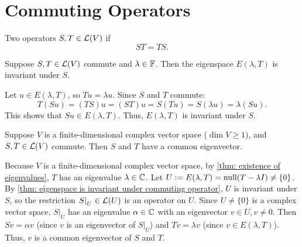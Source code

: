 \section{Commuting Operators}

\begin{mydef}
  Two operators $S, T \in \mathcal{L}(V)$  if
  \begin{equation}
    ST = TS.
  \end{equation}
\end{mydef}

\setcounter{thm}{69}
\begin{thm}
  \label{thm: eigenspace is invariant under commuting operator}
  Suppose $S, T \in \mathcal{L}(V)$ commute and $\lambda \in \mathbb{F}$. Then the eigenspace $E(\lambda, T)$ is invariant under $S$.
\end{thm}
\begin{prf}
  Let $u \in E(\lambda, T)$, so $Tu = \lambda u$. Since $S$ and $T$ commute:
  \begin{equation}
    T(Su) = (TS)u = (ST)u = S(Tu) = S(\lambda u) = \lambda (Su).
  \end{equation}
  This shows that $Su \in E(\lambda, T)$. Thus, $E(\lambda, T)$ is invariant under $S$.
\end{prf}

\setcounter{thm}{71}
\begin{thm}
  \label{thm: commuting operators have a common eigenvector}
  Suppose $V$ is a finite-dimensional complex vector space ($\dim V \ge 1$), and $S, T \in \mathcal{L}(V)$ commute. Then $S$ and $T$ have a common eigenvector.
\end{thm}
\begin{prf}
  Because $V$ is a finite-dimensional complex vector space, by \ref{thm: existence of eigenvalues}, $T$ has an eigenvalue $\lambda \in \mathbb{C}$.
  Let $U := E(\lambda, T) = \operatorname{null}(T-\lambda I) \neq \{0\}$.
  By \ref{thm: eigenspace is invariant under commuting operator}, $U$ is invariant under $S$, so the restriction $\left.S\right|_U \in \mathcal{L}(U)$ is an operator on $U$.
  Since $U \neq \{0\}$ is a complex vector space, $\left.S\right|_U$ has an eigenvalue $\alpha \in \mathbb{C}$ with an eigenvector $v \in U, v \neq 0$.
  Then $Sv = \alpha v$ (since $v$ is an eigenvector of $\left.S\right|_U$) and $Tv = \lambda v$ (since $v \in E(\lambda, T)$).
  Thus, $v$ is a common eigenvector of $S$ and $T$.
\end{prf}

